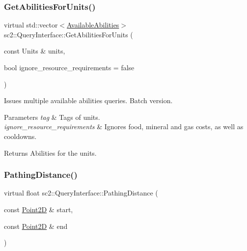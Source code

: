 \subsubsection{\texorpdfstring{Get\+Abilities\+For\+Units()}{GetAbilitiesForUnits()}}
{\footnotesize\ttfamily virtual std\+::vector$<$\hyperlink{structsc2_1_1_available_abilities}{Available\+Abilities}$>$ sc2\+::\+Query\+Interface\+::\+Get\+Abilities\+For\+Units (\begin{DoxyParamCaption}\item[{const Units \&}]{units,  }\item[{bool}]{ignore\+\_\+resource\+\_\+requirements = {\ttfamily false} }\end{DoxyParamCaption})\hspace{0.3cm}{\ttfamily [pure virtual]}}

Issues multiple available abilities queries. Batch version. 
\begin{DoxyParams}{Parameters}
{\em tag} & Tags of units. \\
\hline
{\em ignore\+\_\+resource\+\_\+requirements} & Ignores food, mineral and gas costs, as well as cooldowns. \\
\hline
\end{DoxyParams}
\begin{DoxyReturn}{Returns}
Abilities for the units. 
\end{DoxyReturn}
\mbox{\label{classsc2_1_1_query_interface_adf72c7556e59e82e231d9c58bd093546}} 
\subsubsection{\texorpdfstring{Pathing\+Distance()}{PathingDistance()}\hspace{0.1cm}{\footnotesize\ttfamily [1/2]}}
{\footnotesize\ttfamily virtual float sc2\+::\+Query\+Interface\+::\+Pathing\+Distance (\begin{DoxyParamCaption}\item[{const \hyperlink{structsc2_1_1_point2_d}{Point2D} \&}]{start,  }\item[{const \hyperlink{structsc2_1_1_point2_d}{Point2D} \&}]{end }\end{DoxyParamCaption})\hspace{0.3cm}{\ttfamily [pure virtual]}}

